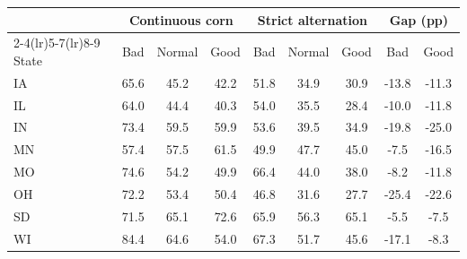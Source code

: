 \begin{tabular}{lcccccccc}
\toprule
& \multicolumn{3}{c}{Continuous corn} & \multicolumn{3}{c}{Strict alternation} & \multicolumn{2}{c}{Gap (pp)}\\
\cmidrule(lr){2-4}\cmidrule(lr){5-7}\cmidrule(lr){8-9}
State & Bad & Normal & Good & Bad & Normal & Good & Bad & Good\\
\midrule
IA & 65.6 & 45.2 & 42.2 & 51.8 & 34.9 & 30.9 & -13.8 & -11.3 \\
IL & 64.0 & 44.4 & 40.3 & 54.0 & 35.5 & 28.4 & -10.0 & -11.8 \\
IN & 73.4 & 59.5 & 59.9 & 53.6 & 39.5 & 34.9 & -19.8 & -25.0 \\
MN & 57.4 & 57.5 & 61.5 & 49.9 & 47.7 & 45.0 & -7.5 & -16.5 \\
MO & 74.6 & 54.2 & 49.9 & 66.4 & 44.0 & 38.0 & -8.2 & -11.8 \\
OH & 72.2 & 53.4 & 50.4 & 46.8 & 31.6 & 27.7 & -25.4 & -22.6 \\
SD & 71.5 & 65.1 & 72.6 & 65.9 & 56.3 & 65.1 & -5.5 & -7.5 \\
WI & 84.4 & 64.6 & 54.0 & 67.3 & 51.7 & 45.6 & -17.1 & -8.3 \\
\bottomrule
\end{tabular}
